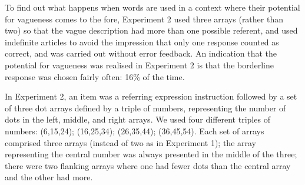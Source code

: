 

To find out what happens when words are used in a context where their potential for vagueness comes to the fore, Experiment 2 used three arrays (rather than two) so that the vague description had more than one possible referent, and used indefinite articles to avoid the impression that only one response counted as correct, and was carried out without error feedback.
An indication that the potential for vagueness was realised in Experiment 2 is that the borderline response was chosen fairly often: 16\% of the time.

In Experiment 2, an item was a referring expression instruction followed by a set of three dot arrays defined by a triple of numbers, representing the number of dots in the left, middle, and right arrays. We used four different triples of numbers: (6,15,24); (16,25,34); (26,35,44); (36,45,54). Each set of arrays comprised three arrays (instead of two as in Experiment 1); the array representing the central number was always presented in the middle of the three; there were two flanking arrays where one had fewer dots than the central array and the other had more.

